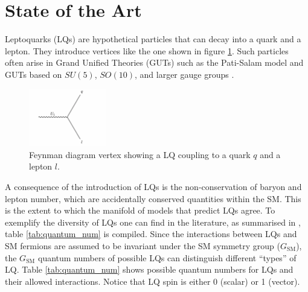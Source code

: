 \section{State of the Art}

Leptoquarks (LQs) are hypothetical particles that can decay into a quark and a lepton. They introduce vertices like the one shown in figure \ref{fig:vertex}. Such particles often arise in Grand Unified Theories (GUTs) such as the Pati-Salam model \cite{pati_lepton_1974, baker_high_2019} and GUTs based on $SU(5)$, $SO(10)$, and larger gauge groups \cite{goldberg_standard_2017, da_rold_vector_2019}. 

\begin{figure}[b]
    \centering
    \includegraphics[width = 0.3\textwidth]{images/lq-vertex.png}
    \caption{Feynman diagram vertex showing a LQ coupling to a quark $q$ and a lepton $l$.}
    \label{fig:vertex}
\end{figure}

A consequence of the introduction of LQs is the non-conservation of baryon and lepton number, which are accidentally conserved quantities within the SM. This is the extent to which the manifold of models that predict LQs agree. To exemplify the diversity of LQs one can find in the literature, as summarised in \cite{zyla_review_2020}, table \ref{tab:quantum_num} is compiled. Since the interactions between LQs and SM fermions are assumed to be invariant under the SM symmetry group ($G_{\text{SM}}$), the $G_{\text{SM}}$ quantum numbers of possible LQs can distinguish different ``types'' of LQ. Table \ref{tab:quantum_num} shows possible quantum numbers for LQs and their allowed interactions. Notice that LQ spin is either 0 (scalar) or 1 (vector). 

